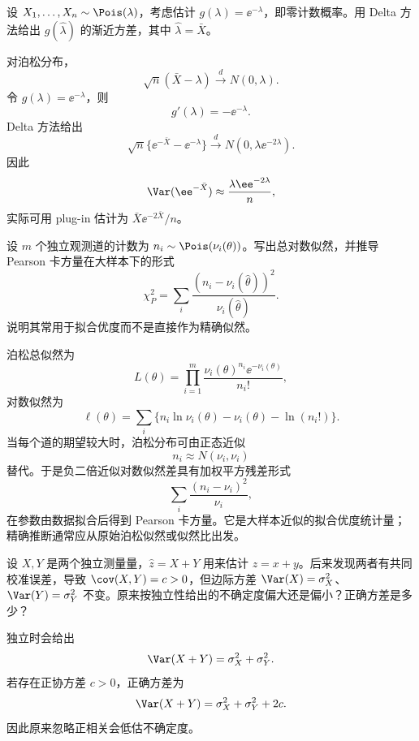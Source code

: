 \begin{question}
设 $X_1,\ldots,X_n\sim\Pois(\lambda)$，考虑估计 $g(\lambda)=\ee^{-\lambda}$，即零计数概率。用 Delta 方法给出 $g(\hat\lambda)$ 的渐近方差，其中 $\hat\lambda=\bar X$。
\begin{solution}
对泊松分布，
\[
\sqrt n(\bar X-\lambda)\xrightarrow{d}N(0,\lambda).
\]
令 $g(\lambda)=\ee^{-\lambda}$，则
\[
g'(\lambda)=-\ee^{-\lambda}.
\]
Delta 方法给出
\[
\sqrt n\{\ee^{-\bar X}-\ee^{-\lambda}\}
\xrightarrow{d}N(0,\lambda\ee^{-2\lambda}).
\]
因此
\[
\Var(\ee^{-\bar X})\approx\frac{\lambda\ee^{-2\lambda}}n,
\]
实际可用 plug-in 估计为 $\bar X\ee^{-2\bar X}/n$。
\end{solution}
\end{question}

\begin{question}
设 $m$ 个独立观测道的计数为 $n_i\sim\Pois(\nu_i(\theta))$。写出总对数似然，并推导 Pearson 卡方量在大样本下的形式
\[
\chi_P^2=\sum_i\frac{(n_i-\nu_i(\hat\theta))^2}{\nu_i(\hat\theta)}.
\]
说明其常用于拟合优度而不是直接作为精确似然。
\begin{solution}
泊松总似然为
\[
L(\theta)=\prod_{i=1}^m\frac{\nu_i(\theta)^{n_i}\ee^{-\nu_i(\theta)}}{n_i!},
\]
对数似然为
\[
\ell(\theta)=\sum_i\{n_i\ln\nu_i(\theta)-\nu_i(\theta)-\ln(n_i!)\}.
\]
当每个道的期望较大时，泊松分布可由正态近似
\[
n_i\approx N(\nu_i,\nu_i)
\]
替代。于是负二倍近似对数似然差具有加权平方残差形式
\[
\sum_i\frac{(n_i-\nu_i)^2}{\nu_i},
\]
在参数由数据拟合后得到 Pearson 卡方量。它是大样本近似的拟合优度统计量；精确推断通常应从原始泊松似然或似然比出发。
\end{solution}
\end{question}

\begin{question}
设 $X,Y$ 是两个独立测量量，$\hat z=X+Y$ 用来估计 $z=x+y$。后来发现两者有共同校准误差，导致 $\cov(X,Y)=c>0$，但边际方差 $\Var(X)=\sigma_X^2$、$\Var(Y)=\sigma_Y^2$ 不变。原来按独立性给出的不确定度偏大还是偏小？正确方差是多少？
\begin{solution}
独立时会给出
\[
\Var(X+Y)=\sigma_X^2+\sigma_Y^2.
\]
若存在正协方差 $c>0$，正确方差为
\[
\Var(X+Y)=\sigma_X^2+\sigma_Y^2+2c.
\]
因此原来忽略正相关会低估不确定度。
\end{solution}
\end{question}

